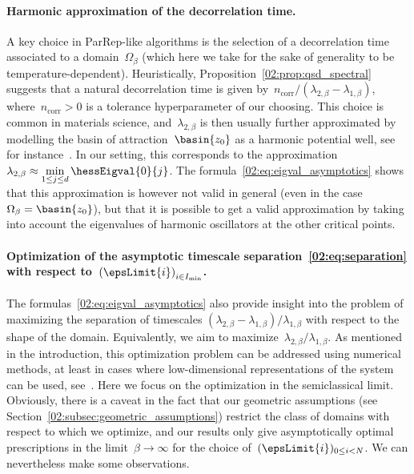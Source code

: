     \paragraph{Harmonic approximation of the decorrelation time.} A key choice in ParRep-like algorithms is the selection of a decorrelation time associated to a domain~$\Omega_\beta$ (which here we take for the sake of generality to be temperature-dependent). Heuristically, Proposition~\ref{02:prop:qsd_spectral} suggests that a natural decorrelation time is given by~$n_{\mathrm{corr}}/(\lambda_{2,\beta}-\lambda_{1,\beta})$, where~$n_{\mathrm{corr}}>0$ is a tolerance hyperparameter of our choosing.
    This choice is common in materials science, and~$\lambda_{2,\beta}$ is then usually further approximated by modelling the basin of attraction~$\basin{z_0}$ as a harmonic potential well, see for instance~\cite[Section 2.10]{PUV15}. In our setting, this corresponds to the approximation~$\lambda_{2,\beta}\approx \underset{1\leq j\leq d}{\min}\,\hessEigval{0}{j}$. The formula~\eqref{02:eq:eigval_asymptotics} shows that this approximation is however not valid in general (even in the case~$\Omega_\beta=\basin{z_0}$), but that it is possible to get a valid approximation by taking into account the eigenvalues of harmonic oscillators at the other critical points.
    \paragraph{Optimization of the asymptotic timescale separation~\eqref{02:eq:separation} with respect to~$\left(\epsLimit{i}\right)_{i\in I_{\min}}$.}
    The formulas~\eqref{02:eq:eigval_asymptotics} also provide insight into the problem of maximizing the separation of timescales ${(\lambda_{2,\beta}-\lambda_{1,\beta})/\lambda_{1,\beta}}$ with respect to the shape of the domain. Equivalently, we aim to maximize~$\lambda_{2,\beta}/\lambda_{1,\beta}$. As mentioned in the introduction, this optimization problem can be addressed using numerical methods, at least in cases where low-dimensional representations of the system can be used, see~\cite{BLS24}. Here we focus on the optimization in the semiclassical limit.
    Obviously, there is a caveat in the fact that our geometric assumptions (see Section~\ref{02:subsec:geometric_assumptions}) restrict the class of domains with respect to which we optimize, and our results only give asymptotically optimal prescriptions in the limit~${\beta\to\infty}$ for the choice of~$(\epsLimit{i})_{0\leq i < N}$. We can nevertheless make some observations.


